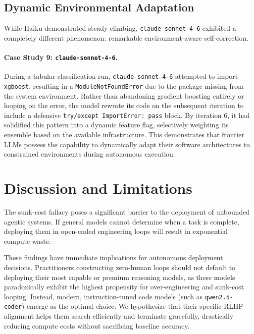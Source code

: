 \documentclass[11pt]{article}
\begin{document}
\subsection{Dynamic Environmental Adaptation}

While Haiku demonstrated steady climbing, \texttt{claude-sonnet-4-6} exhibited a completely different phenomenon: remarkable environment-aware self-correction.

\paragraph{Case Study 9: \texttt{claude-sonnet-4-6}.} During a tabular classification run, \texttt{claude-sonnet-4-6} attempted to import \texttt{xgboost}, resulting in a \texttt{ModuleNotFoundError} due to the package missing from the system environment. Rather than abandoning gradient boosting entirely or looping on the error, the model rewrote its code on the subsequent iteration to include a defensive \texttt{try/except ImportError: pass} block. By iteration 6, it had solidified this pattern into a dynamic feature flag, selectively weighting its ensemble based on the available infrastructure. This demonstrates that frontier LLMs possess the capability to dynamically adapt their software architectures to constrained environments during autonomous execution.

\section{Discussion and Limitations}
\label{sec:discussion}

The sunk-cost fallacy poses a significant barrier to the deployment of unbounded agentic systems. If general models cannot determine when a task is complete, deploying them in open-ended engineering loops will result in exponential compute waste.

These findings have immediate implications for autonomous deployment decisions. Practitioners constructing zero-human loops should not default to deploying their most capable or premium reasoning models, as these models paradoxically exhibit the highest propensity for over-engineering and sunk-cost looping. Instead, modern, instruction-tuned code models (such as \texttt{qwen2.5-coder}) emerge as the optimal choice. We hypothesize that their specific RLHF alignment helps them search efficiently and terminate gracefully, drastically reducing compute costs without sacrificing baseline accuracy.
\end{document}
